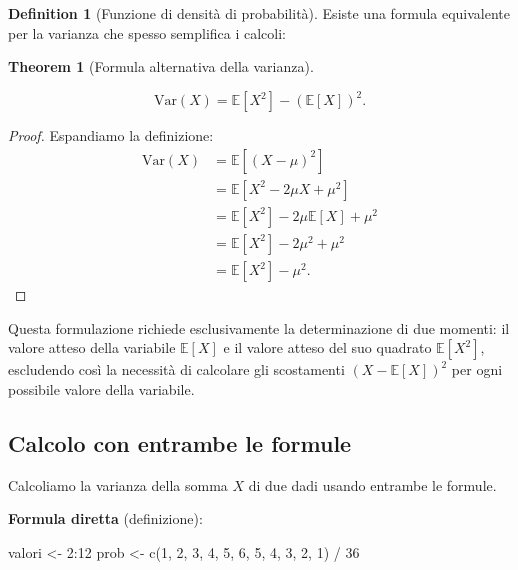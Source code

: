 \documentclass[
  letterpaper,
  DIV=11,
  numbers=noendperiod,
  oneside]{scrreprt}
\newenvironment{Shaded}{\begin{snugshade}}{\end{snugshade}}
\newcommand{\DecValTok}[1]{\textcolor[rgb]{0.68,0.00,0.00}{#1}}
\newcommand{\FunctionTok}[1]{\textcolor[rgb]{0.28,0.35,0.67}{#1}}
\newcommand{\NormalTok}[1]{\textcolor[rgb]{0.00,0.23,0.31}{#1}}
\newcommand{\OtherTok}[1]{\textcolor[rgb]{0.00,0.23,0.31}{#1}}
\newcommand{\SpecialCharTok}[1]{\textcolor[rgb]{0.37,0.37,0.37}{#1}}
\theoremstyle{definition}
\theoremstyle{plain}
\newtheorem{theorem}{Theorem}[chapter]
\theoremstyle{definition}
\newtheorem{definition}{Definition}[chapter]
\theoremstyle{remark}
\begin{document}
\begin{definition}[Funzione di densità di
probabilità]
Esiste una formula equivalente per la varianza che spesso semplifica i
calcoli:

\begin{theorem}[Formula alternativa della
varianza]\protect\hypertarget{thm-variance-formula}{}\label{thm-variance-formula}

\[
\text{Var}(X) = \mathbb{E}[X^2] - (\mathbb{E}[X])^2.
\]

\end{theorem}

\begin{proof}
Espandiamo la definizione: \begin{align}
\text{Var}(X) &= \mathbb{E}[(X - \mu)^2] \\
&= \mathbb{E}[X^2 - 2\mu X + \mu^2] \\
&= \mathbb{E}[X^2] - 2\mu\mathbb{E}[X] + \mu^2 \\
&= \mathbb{E}[X^2] - 2\mu^2 + \mu^2 \\
&= \mathbb{E}[X^2] - \mu^2.
\end{align}
\end{proof}

Questa formulazione richiede esclusivamente la determinazione di due
momenti: il valore atteso della variabile \(\mathbb{E}[X]\) e il valore
atteso del suo quadrato \(\mathbb{E}[X^2]\), escludendo così la
necessità di calcolare gli scostamenti \((X - \mathbb{E}[X])^2\) per
ogni possibile valore della variabile.

\begin{tcolorbox}[enhanced jigsaw, arc=.35mm, breakable, colbacktitle=quarto-callout-note-color!10!white, opacityback=0, toprule=.15mm, rightrule=.15mm, colback=white, opacitybacktitle=0.6, leftrule=.75mm, coltitle=black, bottomtitle=1mm, left=2mm, toptitle=1mm, title=\textcolor{quarto-callout-note-color}{\faInfo}\hspace{0.5em}{Esempio: Varianza della somma di due dadi}, titlerule=0mm, bottomrule=.15mm, colframe=quarto-callout-note-color-frame]

\subsection{Calcolo con entrambe le
formule}\label{calcolo-con-entrambe-le-formule}

Calcoliamo la varianza della somma \(X\) di due dadi usando entrambe le
formule.

\textbf{Formula diretta} (definizione):

\begin{Shaded}
\begin{Highlighting}[]
\NormalTok{valori }\OtherTok{\textless{}{-}} \DecValTok{2}\SpecialCharTok{:}\DecValTok{12}
\NormalTok{prob }\OtherTok{\textless{}{-}} \FunctionTok{c}\NormalTok{(}\DecValTok{1}\NormalTok{, }\DecValTok{2}\NormalTok{, }\DecValTok{3}\NormalTok{, }\DecValTok{4}\NormalTok{, }\DecValTok{5}\NormalTok{, }\DecValTok{6}\NormalTok{, }\DecValTok{5}\NormalTok{, }\DecValTok{4}\NormalTok{, }\DecValTok{3}\NormalTok{, }\DecValTok{2}\NormalTok{, }\DecValTok{1}\NormalTok{) }\SpecialCharTok{/} \DecValTok{36}


\end{Highlighting}
\end{Shaded}
\end{tcolorbox}
\end{definition}
\end{document}
